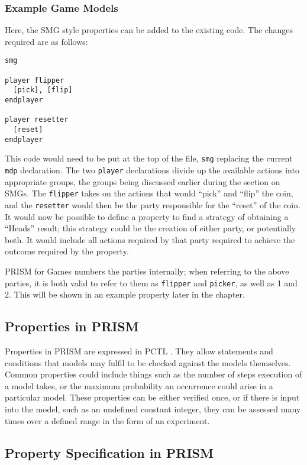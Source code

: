 \documentclass{l4proj}
\begin{document}
\subsubsection{Example Game Models}

Here, the SMG style properties can be added to the existing code. The changes required are as follows:
\begin{minipage}{\linewidth}
\begin{lstlisting}
smg 

player flipper
  [pick], [flip]
endplayer

player resetter
  [reset]
endplayer
\end{lstlisting}
\end{minipage}
This code would need to be put at the top of the file, {\tt smg} replacing the current {\tt mdp} declaration. The two {\tt player} declarations divide up the available actions into appropriate groups, the groups being discussed earlier during the section on SMGs. The {\tt flipper} takes on the actions  that would ``pick'' and ``flip'' the coin, and the {\tt resetter} would then be the party responsible for the ``reset'' of the coin. It would now be possible to define a property to find a strategy of obtaining a ``Heads'' result; this strategy could be the creation of either party, or potentially both. It would include all actions required by that party required to achieve the outcome required by the property.

PRISM for Games numbers the parties internally; when referring to the above parties, it is both valid to refer to them as {\tt flipper} and {\tt picker}, as well as 1 and 2. This will be shown in an example property later in the chapter.

\subsection{Properties in PRISM}

Properties in PRISM are expressed in PCTL \cite{}. They allow statements and conditions that models may fulfil to be checked against the models themselves. Common properties could include things such as the number of steps execution of a model takes, or the maximum probability an occurrence could arise in a particular model. 
These properties can be either verified once, or if there is input into the model, such as an undefined constant integer, they can be assessed many times over a defined range in the form of an experiment. 

\subsection{Property Specification in PRISM}
\end{document}
